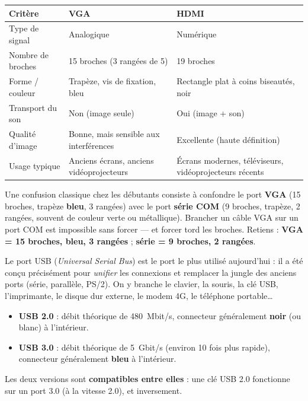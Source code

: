 \documentclass[11pt]{article}
\newcommand{\cle}[1]{{\popxbold\color{popdark}#1}}
\newcounter{popsec}
\newcounter{popsub}
\newcommand{\courssub}[1]{%
  \stepcounter{popsub}%
  \par\vspace{9pt}\noindent{\popxbold\fontsize{11.5}{13}\selectfont\color{popink}{\color{poporange}\thepopsec.\thepopsub}\hspace{6pt}#1}\par\nopagebreak\vspace{4pt}
}
\begin{document}
\begin{center}
\begin{tabularx}{\linewidth}{|l|X|X|}
\hline
\rowcolor{popblueL} \textbf{Critère} & \textbf{VGA} & \textbf{HDMI} \\
\hline
Type de signal & Analogique & Numérique \\
\hline
Nombre de broches & 15 broches (3 rangées de 5) & 19 broches \\
\hline
Forme / couleur & Trapèze, vis de fixation, bleu & Rectangle plat à coins biseautés, noir \\
\hline
Transport du son & Non (image seule) & Oui (image + son) \\
\hline
Qualité d'image & Bonne, mais sensible aux interférences & Excellente (haute définition) \\
\hline
Usage typique & Anciens écrans, anciens vidéoprojecteurs & Écrans modernes, téléviseurs, vidéoprojecteurs récents \\
\hline
\end{tabularx}
\end{center}

\begin{attention}
Une confusion classique chez les débutants consiste à confondre le port \textbf{VGA} (15 broches, trapèze \textbf{bleu}, 3 rangées) avec le port \textbf{série COM} (9 broches, trapèze, 2 rangées, souvent de couleur verte ou métallique). Brancher un câble VGA sur un port COM est impossible sans forcer — et forcer tord les broches. Retiens : \textbf{VGA = 15 broches, bleu, 3 rangées} ; \textbf{série = 9 broches, 2 rangées}.
\end{attention}

\courssub{Le port USB}

Le port \cle{USB} (\emph{Universal Serial Bus}) est le port le plus utilisé aujourd'hui : il a été conçu précisément pour \emph{unifier} les connexions et remplacer la jungle des anciens ports (série, parallèle, PS/2). On y branche le clavier, la souris, la clé USB, l'imprimante, le disque dur externe, le modem 4G, le téléphone portable\ldots

\begin{propriete}
\begin{itemize}
  \item \textbf{USB 2.0} : débit théorique de \SI{480}{Mbit/s}, connecteur généralement \textbf{noir} (ou blanc) à l'intérieur.
  \item \textbf{USB 3.0} : débit théorique de \SI{5}{Gbit/s} (environ 10 fois plus rapide), connecteur généralement \textbf{bleu} à l'intérieur.
\end{itemize}
Les deux versions sont \textbf{compatibles entre elles} : une clé USB 2.0 fonctionne sur un port 3.0 (à la vitesse 2.0), et inversement.
\end{propriete}
\end{document}
